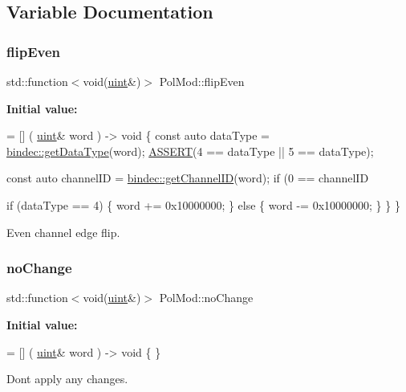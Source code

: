 \subsection{Variable Documentation}
\mbox{\label{namespace_pol_mod_a40220fc636b5ce60f937d5e3e001f630}} 
\subsubsection{\texorpdfstring{flip\+Even}{flipEven}}
{\footnotesize\ttfamily std\+::function$<$void(\hyperlink{namespace_pol_mod_a4d3b4a5eef6446c873dc0b5aa02c4f99}{uint}\&)$>$ Pol\+Mod\+::flip\+Even}

{\bfseries Initial value\+:}
\begin{DoxyCode}
= [] (
    \hyperlink{_packet_8cpp_a69aa29b598b851b0640aa225a9e5d61d}{uint}& word
) -> \textcolor{keywordtype}{void} \{
    \textcolor{keyword}{const} \textcolor{keyword}{auto} dataType = \hyperlink{namespacebindec_a7a98adfd04c65f870f74a423bfd744fe}{bindec::getDataType}(word);
    \hyperlink{_debug_8hpp_aca68c0d4ac8df0838e209fb5300f7be3}{ASSERT}(4 == dataType || 5 == dataType);

    
    \textcolor{keyword}{const} \textcolor{keyword}{auto} channelID = \hyperlink{namespacebindec_af1997af0743251d010780a8f728fcd7e}{bindec::getChannelID}(word);
    \textcolor{keywordflow}{if} (0 == channelID%
        
        \textcolor{keywordflow}{if} (dataType == 4) \{
            word += 0x10000000;
        \} \textcolor{keywordflow}{else} \{
            word -= 0x10000000;
        \}
    \}
\}
\end{DoxyCode}


Even channel edge flip. 

\mbox{\label{namespace_pol_mod_ab917c96757340e5d8901808f819ddf4c}} 
\subsubsection{\texorpdfstring{no\+Change}{noChange}}
{\footnotesize\ttfamily std\+::function$<$void(\hyperlink{namespace_pol_mod_a4d3b4a5eef6446c873dc0b5aa02c4f99}{uint}\&)$>$ Pol\+Mod\+::no\+Change}

{\bfseries Initial value\+:}
\begin{DoxyCode}
= [] (
    \hyperlink{_packet_8cpp_a69aa29b598b851b0640aa225a9e5d61d}{uint}& word
) -> \textcolor{keywordtype}{void} \{ \}
\end{DoxyCode}


Don\textquotesingle{}t apply any changes. 

